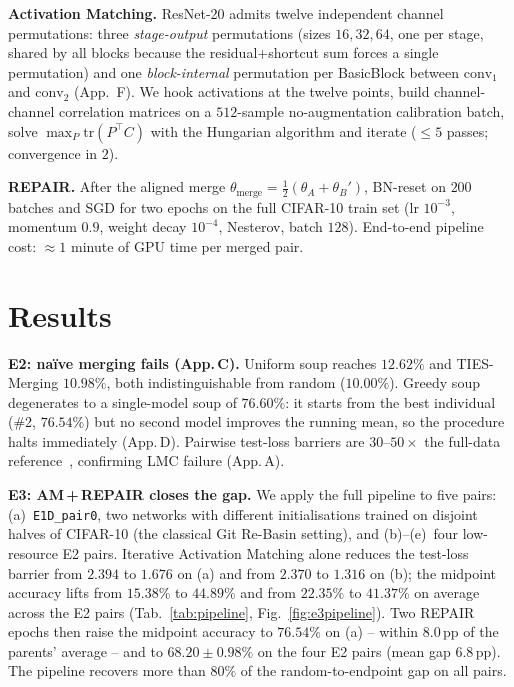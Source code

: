 \documentclass{article}
\begin{document}
\textbf{Activation Matching.} ResNet-20 admits twelve independent channel permutations: three \emph{stage-output} permutations (sizes $16,32,64$, one per stage, shared by all blocks because the residual+shortcut sum forces a single permutation) and one \emph{block-internal} permutation per BasicBlock between $\mathrm{conv}_1$ and $\mathrm{conv}_2$ (App.~F). We hook activations at the twelve points, build channel-channel correlation matrices on a $512$-sample no-augmentation calibration batch, solve $\max_P \mathrm{tr}(P^{\!\top}\!C)$ with the Hungarian algorithm and iterate ($\leq\!5$ passes; convergence in $2$).

\textbf{REPAIR.} After the aligned merge $\theta_{\text{merge}}\!=\!\tfrac{1}{2}(\theta_A\!+\!\theta_B')$, BN-reset on $200$ batches and SGD for two epochs on the full CIFAR-10 train set (lr $10^{-3}$, momentum $0.9$, weight decay $10^{-4}$, Nesterov, batch $128$). End-to-end pipeline cost: $\approx\!1$ minute of GPU time per merged pair.

\section{Results}

\textbf{E2: na\"ive merging fails (App.\,C).} Uniform soup reaches $12.62\%$ and TIES-Merging $10.98\%$, both indistinguishable from random ($10.00\%$). Greedy soup degenerates to a single-model soup of $76.60\%$: it starts from the best individual (\#2, $76.54\%$) but no second model improves the running mean, so the procedure halts immediately (App.\,D). Pairwise test-loss barriers are $30$--$50\times$ the full-data reference~\citep{frankle2020lmc}, confirming LMC failure (App.\,A).

\textbf{E3: AM\,+\,REPAIR closes the gap.} We apply the full pipeline to five pairs: (a)~\texttt{E1D\_pair0}, two networks with different initialisations trained on disjoint halves of CIFAR-10 (the classical Git Re-Basin setting), and (b)--(e)~four low-resource E2 pairs. Iterative Activation Matching alone reduces the test-loss barrier from $2.394$ to $1.676$ on (a) and from $2.370$ to $1.316$ on (b); the midpoint accuracy lifts from $15.38\%$ to $44.89\%$ and from $22.35\%$ to $41.37\%$ on average across the E2 pairs (Tab.~\ref{tab:pipeline}, Fig.~\ref{fig:e3pipeline}). Two REPAIR epochs then raise the midpoint accuracy to $\mathbf{76.54\%}$ on (a) -- within $8.0$\,pp of the parents' average -- and to $\mathbf{68.20\!\pm\!0.98\%}$ on the four E2 pairs (mean gap $6.8$\,pp). The pipeline recovers more than $80\%$ of the random-to-endpoint gap on all pairs.
\end{document}
